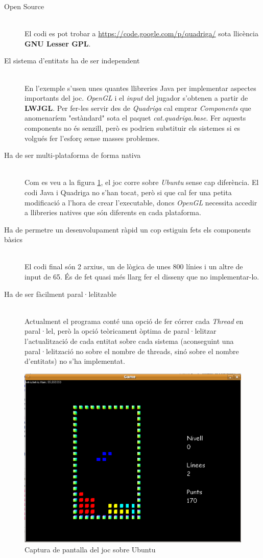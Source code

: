   \begin{description}
    \item[Open Source] \hfill \\
      El codi es pot trobar a \url{https://code.google.com/p/quadriga/} sota llicència {\bf GNU Lesser GPL}.
      
    \item[El sistema d'entitats ha de ser independent] \hfill \\
      En l'exemple s'usen unes quantes llibreries Java per implementar aspectes importants del joc. {\em OpenGL} i el {\em input} del jugador s'obtenen a partir de {\bf LWJGL}. Per fer-les servir des de {\em Quadriga} cal emprar {\em Components} que anomenaríem "estàndard" sota el paquet {\em cat.quadriga.base}. Fer aquests components no és senzill, però es podrien substituir els sistemes si es volgués fer l'esforç sense masses problemes.
      
    \item[Ha de ser multi-plataforma de forma nativa] \hfill \\
      Com es veu a la figura \ref{fig:ImatgeUbuntu}, el joc corre sobre {\em Ubuntu} sense cap diferència. El codi Java i Quadriga no s'han tocat, però si que cal fer una petita modificació a l'hora de crear l'executable, doncs {\em OpenGL} necessita accedir a llibreries natives que són diferents en cada plataforma.
      
    \item[Ha de permetre un desenvolupament ràpid un cop estiguin fets els components bàsics] \hfill \\
      El codi final són 2 arxius, un de lògica de unes 800 línies i un altre de input de 65. És de fet quasi més llarg fer el disseny que no implementar-lo.
      
    \item[Ha de ser fàcilment paral·lelitzable] \hfill \\
      Actualment el programa conté una opció de fer córrer cada {\em Thread} en paral·lel, però la opció teòricament òptima de paral·lelitzar l'actualització de cada entitat sobre cada sistema (aconseguint una paral·lelització no sobre el nombre de threads, sinó sobre el nombre d'entitats) no s'ha implementat.
  \end{description}
    
  \begin{figure}
    \includegraphics[width=1\linewidth]{./img/ImatgeUbuntu.png}
    \caption{Captura de pantalla del joc sobre Ubuntu \label{fig:ImatgeUbuntu}}
  \end{figure}